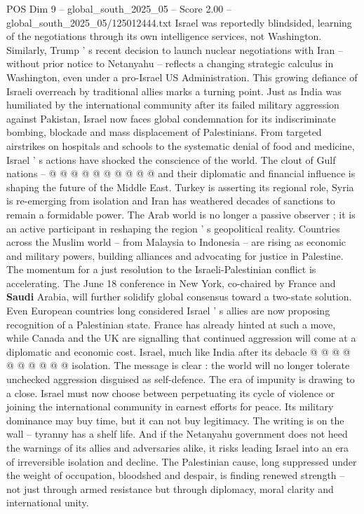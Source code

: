 \begin{textsample}{POS Dim 9 – global\_south\_2025\_05 – Score 2.00 – global\_south\_2025\_05/125012444.txt}
Israel was reportedly blindsided, learning of the negotiations through its own intelligence services, not Washington.
Similarly, Trump ' s recent decision to launch nuclear negotiations with Iran -- without prior notice to Netanyahu -- reflects a changing strategic calculus in Washington, even under a pro-Israel US Administration.
This growing defiance of Israeli overreach by traditional allies marks a turning point.
Just as India was humiliated by the international community after its failed military aggression against Pakistan, Israel now faces global condemnation for its indiscriminate bombing, blockade and mass displacement of Palestinians.
From targeted airstrikes on hospitals and schools to the systematic denial of food and medicine, Israel ' s actions have shocked the conscience of the world.
The clout of Gulf nations -- @ @ @ @ @ @ @ @ @ @ and their diplomatic and financial influence is shaping the future of the Middle East.
Turkey is asserting its regional role, Syria is re-emerging from isolation and Iran has weathered decades of sanctions to remain a formidable power.
The Arab world is no longer a passive observer ; it is an active participant in reshaping the region ' s geopolitical reality.
Countries across the Muslim world -- from Malaysia to Indonesia -- are rising as economic and military powers, building alliances and advocating for justice in Palestine.
The momentum for a just resolution to the Israeli-Palestinian conflict is accelerating.
The June 18 conference in New York, co-chaired by France and \textbf{Saudi} Arabia, will further solidify global consensus toward a two-state solution.
Even European countries long considered Israel ' s allies are now proposing recognition of a Palestinian state.
France has already hinted at such a move, while Canada and the UK are signalling that continued aggression will come at a diplomatic and economic cost.
Israel, much like India after its debacle @ @ @ @ @ @ @ @ @ @ isolation.
The message is clear : the world will no longer tolerate unchecked aggression disguised as self-defence.
The era of impunity is drawing to a close.
Israel must now choose between perpetuating its cycle of violence or joining the international community in earnest efforts for peace.
Its military dominance may buy time, but it can not buy legitimacy.
The writing is on the wall -- tyranny has a shelf life.
And if the Netanyahu government does not heed the warnings of its allies and adversaries alike, it risks leading Israel into an era of irreversible isolation and decline.
The Palestinian cause, long suppressed under the weight of occupation, bloodshed and despair, is finding renewed strength -- not just through armed resistance but through diplomacy, moral clarity and international unity.

\end{textsample}
